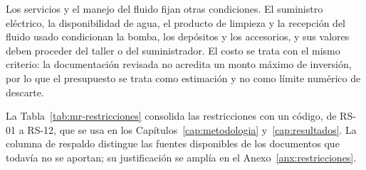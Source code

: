 Los servicios y el manejo del fluido fijan otras condiciones. El suministro eléctrico, la disponibilidad de agua, el producto de limpieza y la recepción del fluido usado condicionan la bomba, los depósitos y los accesorios, y sus valores deben proceder del taller o del suministrador. El costo se trata con el mismo criterio: la documentación revisada no acredita un monto máximo de inversión, por lo que el presupuesto se trata como estimación y no como límite numérico de descarte.

La Tabla~\ref{tab:mr-restricciones} consolida las restricciones con un código, de RS-01 a RS-12, que se usa en los Capítulos~\ref{cap:metodologia} y~\ref{cap:resultados}. La columna de respaldo distingue las fuentes disponibles de los documentos que todavía no se aportan; su justificación se amplía en el Anexo~\ref{anx:restricciones}.

